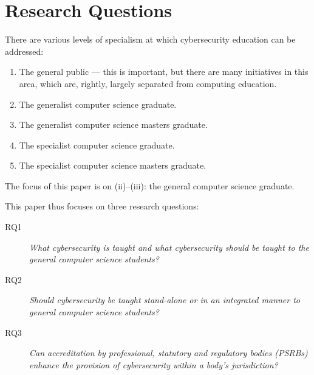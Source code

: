\documentclass[conference]{IEEEtran}
\begin{document}

\section{Research Questions}

There are various levels of specialism at which cybersecurity education can be addressed:
\begin{enumerate}[label=(\roman*)]
\item The general public --- this is important, but there are many initiatives in this area, which are, rightly, largely separated from computing education.
\item The generalist computer science graduate.
\item The generalist computer science masters graduate.
\item The specialist computer science graduate.
\item The specialist computer science masters graduate.
\end{enumerate}
The focus of this paper is on (ii)--(iii): the general computer science graduate.

This paper thus focuses on three research questions:

\begin{description}
\item[RQ1] {\emph{What cybersecurity is taught and what cybersecurity should be taught to the general computer science students?}}
\item[RQ2] {\emph{Should cybersecurity be taught stand-alone or in an integrated manner to general computer science students?}}
\item[RQ3] {\emph{Can accreditation by professional, statutory and regulatory bodies (PSRBs) enhance the provision of cybersecurity within a body's jurisdiction?}}
\end{description}
\end{document}
